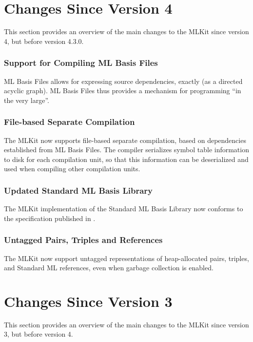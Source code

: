 \documentclass[12pt]{book}
\begin{document}
\section{Changes Since Version 4}
%
This section provides an overview of the main changes to the MLKit
since version 4, but before version 4.3.0.

\subsubsection*{Support for Compiling ML Basis Files}
%
ML Basis Files allows for expressing source dependencies, exactly (as
a directed acyclic graph). ML Basis Files thus provides a mechanism
for programming ``in the very large''.

\subsubsection*{File-based Separate Compilation}
%
The MLKit now supports file-based separate compilation, based on
dependencies established from ML Basis Files. The compiler serializes
symbol table information to disk for each compilation unit, so that
this information can be deserialized and used when compiling other
compilation units.

\subsubsection*{Updated Standard ML Basis Library}
%
%
The MLKit implementation of the Standard ML Basis Library now conforms to the
  specification published in \cite{basislib2004}.

\subsubsection*{Untagged Pairs, Triples and References}
%
%
%
%
The MLKit now support untagged representations of heap-allocated
pairs, triples, and Standard ML references, even when garbage
collection is enabled.

\section{Changes Since Version 3}
%
This section provides an overview of the main changes to the MLKit
since version 3, but before version 4.
\end{document}
